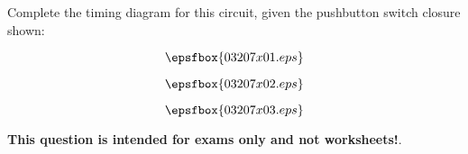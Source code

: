 

Complete the timing diagram for this circuit, given the pushbutton switch closure shown:

$$\epsfbox{03207x01.eps}$$

$$\epsfbox{03207x02.eps}$$







$$\epsfbox{03207x03.eps}$$







{\bf This question is intended for exams only and not worksheets!}.





